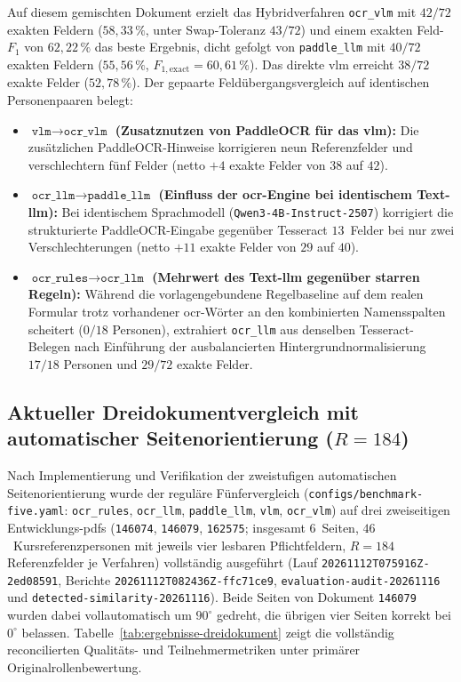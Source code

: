 Auf diesem gemischten Dokument erzielt das Hybridverfahren \texttt{ocr\_vlm} mit $42/72$ exakten Feldern ($58{,}33\,\%$, unter Swap-Toleranz $43/72$) und einem exakten Feld-$F_1$ von $62{,}22\,\%$ das beste Ergebnis, dicht gefolgt von \texttt{paddle\_llm} mit $40/72$ exakten Feldern ($55{,}56\,\%$, $F_{1,\mathrm{exact}} = 60{,}61\,\%$). Das direkte \ac{vlm} erreicht $38/72$ exakte Felder ($52{,}78\,\%$). Der gepaarte Feldübergangsvergleich auf identischen Personenpaaren belegt:
\begin{itemize}
  \item \textbf{$\texttt{vlm} \rightarrow \texttt{ocr\_vlm}$ (Zusatznutzen von PaddleOCR für das \ac{vlm}):} Die zusätzlichen PaddleOCR-Hinweise korrigieren neun Referenzfelder und verschlechtern fünf Felder (netto $+4$ exakte Felder von $38$ auf $42$).
  \item \textbf{$\texttt{ocr\_llm} \rightarrow \texttt{paddle\_llm}$ (Einfluss der \ac{ocr}-Engine bei identischem Text-\ac{llm}):} Bei identischem Sprachmodell (\texttt{Qwen3-4B-Instruct-2507}) korrigiert die strukturierte PaddleOCR-Eingabe gegenüber Tesseract $13$~Felder bei nur zwei Verschlechterungen (netto $+11$ exakte Felder von $29$ auf $40$).
  \item \textbf{$\texttt{ocr\_rules} \rightarrow \texttt{ocr\_llm}$ (Mehrwert des Text-\ac{llm} gegenüber starren Regeln):} Während die vorlagengebundene Regelbaseline auf dem realen Formular trotz vorhandener \ac{ocr}-Wörter an den kombinierten Namensspalten scheitert ($0/18$ Personen), extrahiert \texttt{ocr\_llm} aus denselben Tesseract-Belegen nach Einführung der ausbalancierten Hintergrundnormalisierung $17/18$ Personen und $29/72$ exakte Felder.
\end{itemize}

\subsection{Aktueller Dreidokumentvergleich mit automatischer Seitenorientierung (\texorpdfstring{$R = 184$}{R = 184})}
\label{subsec:ergebnisse-dreidokument}

Nach Implementierung und Verifikation der zweistufigen automatischen Seitenorientierung wurde der reguläre Fünfervergleich (\texttt{configs/benchmark-five.yaml}: \texttt{ocr\_rules}, \texttt{ocr\_llm}, \texttt{paddle\_llm}, \texttt{vlm}, \texttt{ocr\_vlm}) auf drei zweiseitigen Entwicklungs-\acp{pdf} (\texttt{146074}, \texttt{146079}, \texttt{162575}; insgesamt $6$~Seiten, $46$~Kursreferenzpersonen mit jeweils vier lesbaren Pflichtfeldern, $R = 184$ Referenzfelder je Verfahren) vollständig ausgeführt (Lauf \texttt{20261112T075916Z-2ed08591}, Berichte \texttt{20261112T082436Z-ffc71ce9}, \texttt{evaluation-audit-20261116} und \texttt{detected-similarity-20261116}). Beide Seiten von Dokument \texttt{146079} wurden dabei vollautomatisch um $90^\circ$ gedreht, die übrigen vier Seiten korrekt bei $0^\circ$ belassen. Tabelle~\ref{tab:ergebnisse-dreidokument} zeigt die vollständig reconcilierten Qualitäts- und Teilnehmermetriken unter primärer Originalrollenbewertung.

